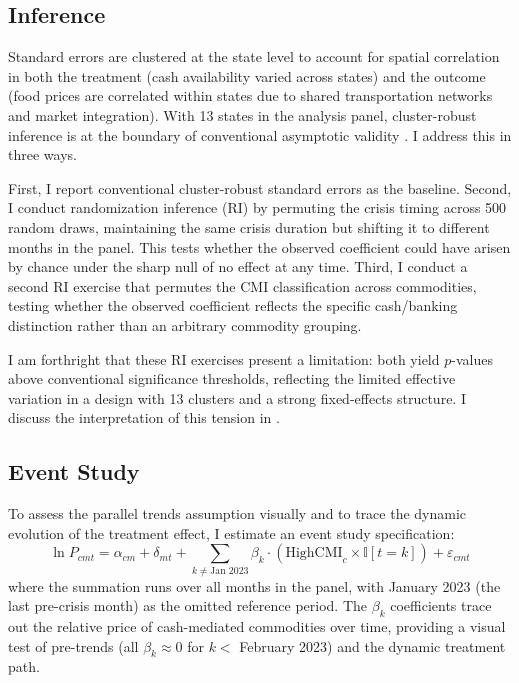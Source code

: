 \documentclass[12pt]{article}
\newcommand{\ind}{\mathbb{I}}
\begin{document}
\subsection{Inference}

Standard errors are clustered at the state level to account for spatial correlation in both the treatment (cash availability varied across states) and the outcome (food prices are correlated within states due to shared transportation networks and market integration). With 13 states in the analysis panel, cluster-robust inference is at the boundary of conventional asymptotic validity \citep{cameron2008bootstrap}. I address this in three ways.

First, I report conventional cluster-robust standard errors as the baseline. Second, I conduct randomization inference (RI) by permuting the crisis timing across 500 random draws, maintaining the same crisis duration but shifting it to different months in the panel. This tests whether the observed coefficient could have arisen by chance under the sharp null of no effect at any time. Third, I conduct a second RI exercise that permutes the CMI classification across commodities, testing whether the observed coefficient reflects the specific cash/banking distinction rather than an arbitrary commodity grouping.

I am forthright that these RI exercises present a limitation: both yield $p$-values above conventional significance thresholds, reflecting the limited effective variation in a design with 13 clusters and a strong fixed-effects structure. I discuss the interpretation of this tension in .

\subsection{Event Study}

To assess the parallel trends assumption visually and to trace the dynamic evolution of the treatment effect, I estimate an event study specification:
\begin{equation}
\ln P_{cmt} = \alpha_{cm} + \delta_{mt} + \sum_{k \neq \text{Jan 2023}} \beta_k \cdot (\text{HighCMI}_c \times \ind[t = k]) + \varepsilon_{cmt}
\label{eq:eventstudy}
\end{equation}
where the summation runs over all months in the panel, with January 2023 (the last pre-crisis month) as the omitted reference period. The $\beta_k$ coefficients trace out the relative price of cash-mediated commodities over time, providing a visual test of pre-trends (all $\beta_k \approx 0$ for $k < $ February 2023) and the dynamic treatment path.
\end{document}
